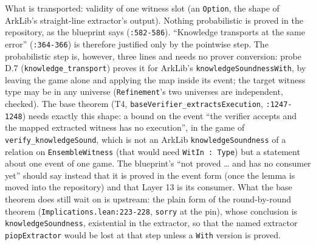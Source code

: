 What is transported: validity of one witness slot (an \texttt{Option}, the shape of ArkLib's straight-line extractor's output). Nothing probabilistic is proved in the repository, as the blueprint says (\texttt{:582-{}586}). \enquote{Knowledge transports at the same error} (\texttt{:364-{}366}) is therefore justified only by the pointwise step. The probabilistic step is, however, three lines and needs no prover conversion: probe D.7 (\texttt{knowledge\_\allowbreak{}transport}) proves it for ArkLib's \texttt{knowledgeSoundnessWith}, by leaving the game alone and applying the map inside its event; the target witness type may be in any universe (\texttt{Refinement}'s two universes are independent, checked). The base theorem (T4, \texttt{b\allowbreak{}a\allowbreak{}s\allowbreak{}e\allowbreak{}V\allowbreak{}e\allowbreak{}r\allowbreak{}i\allowbreak{}f\allowbreak{}i\allowbreak{}e\allowbreak{}r\allowbreak{}\_\allowbreak{}e\allowbreak{}x\allowbreak{}t\allowbreak{}r\allowbreak{}a\allowbreak{}c\allowbreak{}t\allowbreak{}s\allowbreak{}E\allowbreak{}x\allowbreak{}e\allowbreak{}c\allowbreak{}u\allowbreak{}t\allowbreak{}i\allowbreak{}o\allowbreak{}n}, \texttt{:1247-{}1248}) needs exactly this shape: a bound on the event \enquote{the verifier accepts and the mapped extracted witness has no execution}, in the game of \texttt{verify\_\allowbreak{}knowledgeSound}, which is not an ArkLib \texttt{knowledgeSoundness} of a relation on \texttt{EnsembleWitness} (that would need \texttt{WitIn : Type}) but a statement about one event of one game. The blueprint's \enquote{not proved … and has no consumer yet} should say instead that it is proved in the event form (once the lemma is moved into the repository) and that Layer 13 is its consumer. What the base theorem does still wait on is upstream: the plain form of the round-by-round theorem (\texttt{Implications.\allowbreak{}lean:223-{}228}, \texttt{sorry} at the pin), whose conclusion is \texttt{knowledgeSoundness}, existential in the extractor, so that the named extractor \texttt{piopExtractor} would be lost at that step unless a \texttt{With} version is proved.
